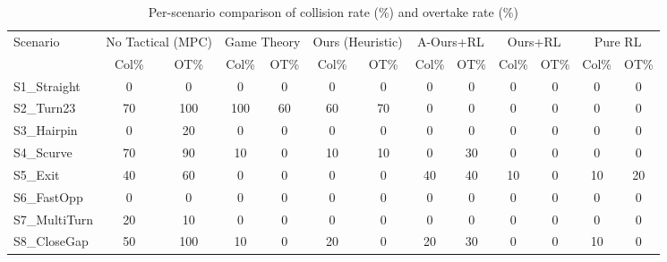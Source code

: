 \begin{table}[htbp]
\centering
\caption{Per-scenario comparison of collision rate (\%) and overtake rate (\%)}
\label{tab:per_scenario}
\begin{tabular}{lcccccccccccc}
\toprule
Scenario & \multicolumn{2}{c}{No Tactical (MPC)} & \multicolumn{2}{c}{Game Theory} & \multicolumn{2}{c}{Ours (Heuristic)} & \multicolumn{2}{c}{A-Ours+RL} & \multicolumn{2}{c}{Ours+RL} & \multicolumn{2}{c}{Pure RL} \\
 & Col\% & OT\% & Col\% & OT\% & Col\% & OT\% & Col\% & OT\% & Col\% & OT\% & Col\% & OT\% \\
\midrule
S1_Straight & 0 & 0 & 0 & 0 & 0 & 0 & 0 & 0 & 0 & 0 & 0 & 0 \\
S2_Turn23 & 70 & 100 & 100 & 60 & 60 & 70 & 0 & 0 & 0 & 0 & 0 & 0 \\
S3_Hairpin & 0 & 20 & 0 & 0 & 0 & 0 & 0 & 0 & 0 & 0 & 0 & 0 \\
S4_Scurve & 70 & 90 & 10 & 0 & 10 & 10 & 0 & 30 & 0 & 0 & 0 & 0 \\
S5_Exit & 40 & 60 & 0 & 0 & 0 & 0 & 40 & 40 & 10 & 0 & 10 & 20 \\
S6_FastOpp & 0 & 0 & 0 & 0 & 0 & 0 & 0 & 0 & 0 & 0 & 0 & 0 \\
S7_MultiTurn & 20 & 10 & 0 & 0 & 0 & 0 & 0 & 0 & 0 & 0 & 0 & 0 \\
S8_CloseGap & 50 & 100 & 10 & 0 & 20 & 0 & 20 & 30 & 0 & 0 & 10 & 0 \\
\bottomrule
\end{tabular}
\end{table}